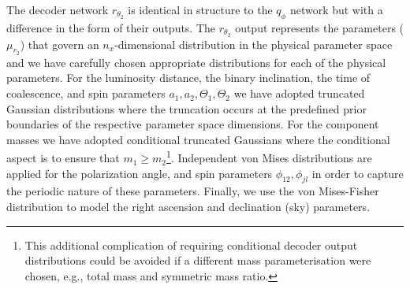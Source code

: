 \documentclass[%
showpacs,
nofootinbib,
 amsmath,amssymb,
 aps,
 twocolumn,
 prl,
 reprint,
floatfix,
]{revtex4-1}
\newcommand{\hunter}[1]{\textbf{\textcolor{blue}{HUNTER: #1}}}
\begin{document}
%
%
The decoder network $r_{\theta_2}$ is identical in structure to the
$q_{\phi}$ network but with a difference in the form of their outputs. The
$r_{\theta_2}$ output represents the parameters ($\mu_{r_2}$) that govern an
$n_x$-dimensional distribution in the physical parameter space and we have
carefully chosen appropriate distributions for each of the physical parameters.
For the luminosity distance, the binary inclination, the time of
coalescence, and spin parameters $a_1,a_2,\Theta_1,\Theta_2$ we have 
adopted truncated Gaussian distributions where the
truncation occurs at the predefined prior boundaries of the respective
parameter space dimensions. For the component masses we have adopted
conditional truncated Gaussians where the conditional aspect is to ensure that
$m_{1}\geq m_{2}$\footnote{This additional complication of requiring conditional
decoder output distributions could be avoided if a different mass
parameterisation were chosen, e.g., total mass and symmetric mass ratio.}. 
Independent von Mises distributions are applied for the polarization angle, 
and spin parameters $\phi_{12},\phi_{jl}$ in order to capture the periodic 
nature of these parameters. Finally, we use the von Mises-Fisher distribution
to model the right ascension and declination (sky) parameters.    

%
%

\end{document}
